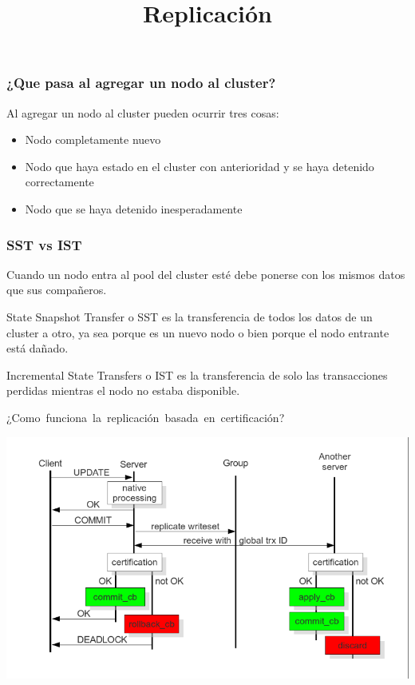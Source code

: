 \documentclass[UTF8]{beamer}
\begin{document}
\begin{frame}
	\frametitle{¿Que pasa al agregar un nodo al cluster?}
	Al agregar un nodo al cluster pueden ocurrir tres cosas:
	\pause
	\begin{itemize}
		\item Nodo completamente nuevo
		\pause
		\item Nodo que haya estado en el cluster con anterioridad y se haya detenido correctamente
		\pause
		\item Nodo que se haya detenido inesperadamente
	\end{itemize}
\end{frame}

\begin{frame}
	\frametitle{SST vs IST}
	Cuando un nodo entra al pool del cluster esté debe ponerse con los mismos datos que sus compañeros.
	\pause
	\begin{framed}
		State Snapshot Transfer o SST es la transferencia de todos los datos de un cluster a otro, ya sea porque es un nuevo nodo o bien porque el nodo entrante está dañado.
	\end{framed}
	\pause
	\begin{framed}
		Incremental State Transfers o IST es la transferencia de solo las transacciones perdidas mientras el nodo no estaba disponible.
	\end{framed}
\end{frame}


\title[Replicación]{Replicación}
\begin{frame}
	\centering
	\mbox{¿Como funciona la replicación basada en certificación?}	
\end{frame}


\begin{frame}
	\includegraphics[width=\textwidth,height=\textheight,keepaspectratio]{images/certificationbasedreplication.png}
\end{frame}
\end{document}
